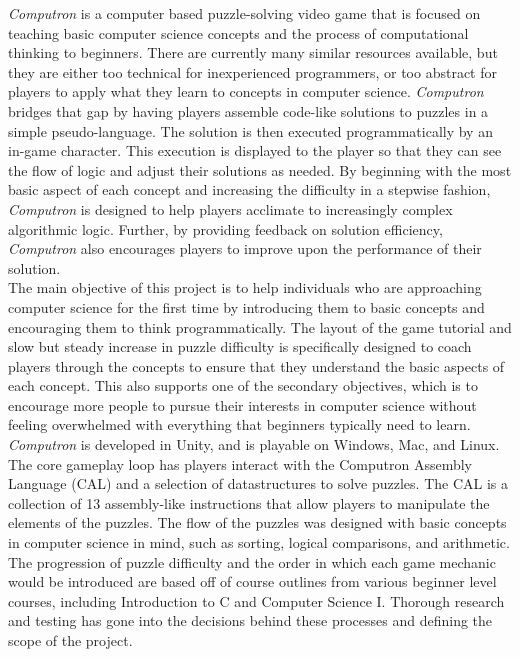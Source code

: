 \textit{Computron} is a computer based puzzle-solving video game that is focused on teaching basic computer science concepts and the process of computational thinking to beginners. There are currently many similar resources available, but they are either too technical for inexperienced programmers, or too abstract for players to apply what they learn to concepts in computer science. \textit{Computron} bridges that gap by having players assemble code-like solutions to puzzles in a simple pseudo-language. The solution is then executed programmatically by an in-game character. This execution is displayed to the player so that they can see the flow of logic and adjust their solutions as needed. By beginning with the most basic aspect of each concept and increasing the difficulty in a stepwise fashion, \textit{Computron} is designed to help players acclimate to increasingly complex algorithmic logic. Further, by providing feedback on solution efficiency, \textit{Computron} also encourages players to improve upon the performance of their solution.\\

The main objective of this project is to help individuals who are approaching computer science for the first time by introducing them to basic concepts and encouraging them to think programmatically. The layout of the game tutorial and slow but steady increase in puzzle difficulty is specifically designed to coach players through the concepts to ensure that they understand the basic aspects of each concept. This also supports one of the secondary objectives, which is to encourage more people to pursue their interests in computer science without feeling overwhelmed with everything that beginners typically need to learn.\\

\textit{Computron} is developed in Unity, and is playable on Windows, Mac, and Linux. The core gameplay loop has players interact with the Computron Assembly Language (CAL) and a selection of datastructures to solve puzzles. The CAL is a collection of 13 assembly-like instructions that allow players to manipulate the elements of the puzzles. The flow of the puzzles was designed with basic concepts in computer science in mind, such as sorting, logical comparisons, and arithmetic. The progression of puzzle difficulty and the order in which each game mechanic would be introduced are based off of course outlines from various beginner level courses, including Introduction to C and Computer Science I. Thorough research and testing has gone into the decisions behind these processes and defining the scope of the project.